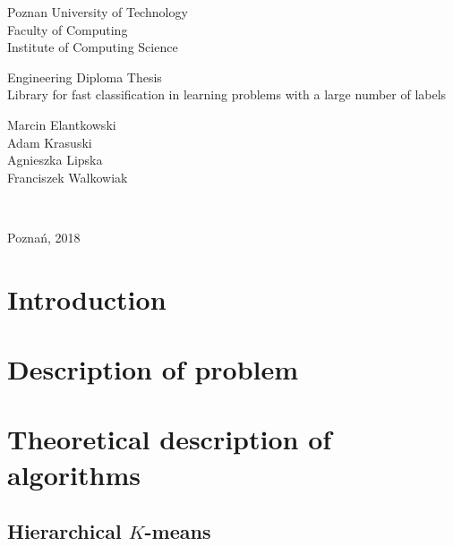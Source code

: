 \documentclass[12pt]{article}
\begin{document}
\thispagestyle{empty}
\begin{center}
	\begin{Large}
	Poznan University of Technology\\
	Faculty of Computing\\
	Institute of Computing Science\\
	\end{Large}
	\vspace*{\fill}
		\begin{Large}
			Engineering Diploma Thesis\\
			\vspace{2ex}
			Library for fast classification in learning problems with a large number of labels\\
			\vspace{2ex}
		\end{Large}
		\begin{large}
			\vspace{2ex}
			Marcin Elantkowski\\
			Adam Krasuski\\
			Agnieszka Lipska\\
			Franciszek Walkowiak\\
		\end{large}
	\vspace*{\fill}
\end{center}
\begin{large}
	\\
\end{large}
\begin{center}
	\vspace{5ex}
	Poznań, 2018
\end{center}
\restoregeometry
\newpage
\tableofcontents
\newpage
\section{Introduction}
	
\section{Description of problem}
	
\section{Theoretical description of algorithms}
	
	\subsection{Hierarchical $K$-means}
	
\end{document}
